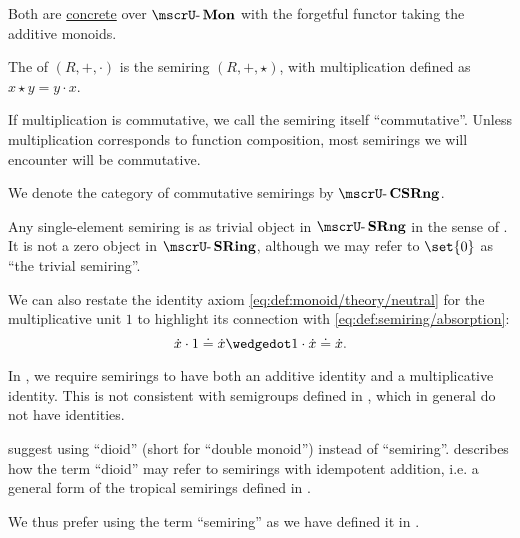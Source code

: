 \begin{definition}
\begin{thmenum}
    Both are \hyperref[def:concrete_category]{concrete} over \hyperref[def:monoid/category]{\( \ucat{Mon} \)} with the forgetful functor taking the additive monoids.

     The  of \( (R, +, \cdot) \) is the semiring \( (R, +, \star) \), with multiplication defined as \( x \star y = y \cdot x \).

     If multiplication is commutative, we call the semiring itself \enquote{commutative}. Unless multiplication corresponds to function composition, most semirings we will encounter will be commutative.

    We denote the category of commutative semirings by \( \ucat{CSRng} \).

     Any single-element semiring is as trivial object in \( \ucat{SRng} \) in the sense of . It is not a zero object in \( \ucat{SRing} \), although we may refer to \( \set{ 0 } \) as \enquote{the trivial semiring}.
  \end{thmenum}
\end{definition}
\begin{comments}
  \item We can also restate the identity axiom \eqref{eq:def:monoid/theory/neutral} for the multiplicative unit \( 1 \) to highlight its connection with \eqref{eq:def:semiring/absorption}:
  \begin{equation}\label{eq:def:semiring/identity}
    \synx \cdot 1 \syneq \synx \synwedge 1 \cdot \synx \syneq \synx.
  \end{equation}
\end{comments}

\begin{remark}\label{rem:semiring_etymology}
  In , we require semirings to have both an additive identity and a multiplicative identity. This is not consistent with semigroups defined in , which in general do not have identities.

   suggest using \enquote{dioid} (short for \enquote{double monoid}) instead of \enquote{semiring}.  describes how the term \enquote{dioid} may refer to semirings with idempotent addition, i.e. a general form of the tropical semirings defined in .

  We thus prefer using the term \enquote{semiring} as we have defined it in .
\end{remark}

